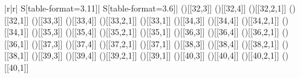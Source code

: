 \begin{table}
{\begin{minipage}{1.0\linewidth}
\begin{tabular}{|r|r|
S[table-format=3.11]|
S[table-format=3.6]|
}
\aLine
{()[[32,3]]}
{()[[32,4]]}
{()[[32,2,1]]}
{()[[32,1]]}
\aLine
{()[[33,3]]}
{()[[33,4]]}
{()[[33,2,1]]}
{()[[33,1]]}
\aLine
{()[[34,3]]}
{()[[34,4]]}
{()[[34,2,1]]}
{()[[34,1]]}
\aLine
{()[[35,3]]}
{()[[35,4]]}
{()[[35,2,1]]}
{()[[35,1]]}
\aLine
{()[[36,3]]}
{()[[36,4]]}
{()[[36,2,1]]}
{()[[36,1]]}
\aLine
{()[[37,3]]}
{()[[37,4]]}
{()[[37,2,1]]}
{()[[37,1]]}
\aLine
{()[[38,3]]}
{()[[38,4]]}
{()[[38,2,1]]}
{()[[38,1]]}
\aLine
{()[[39,3]]}
{()[[39,4]]}
{()[[39,2,1]]}
{()[[39,1]]}
\aLine
{()[[40,3]]}
{()[[40,4]]}
{()[[40,2,1]]}
{()[[40,1]]}
\end{tabular}
\end{minipage}
}    
  \label{tab:oneperinterp}
\end{table}
